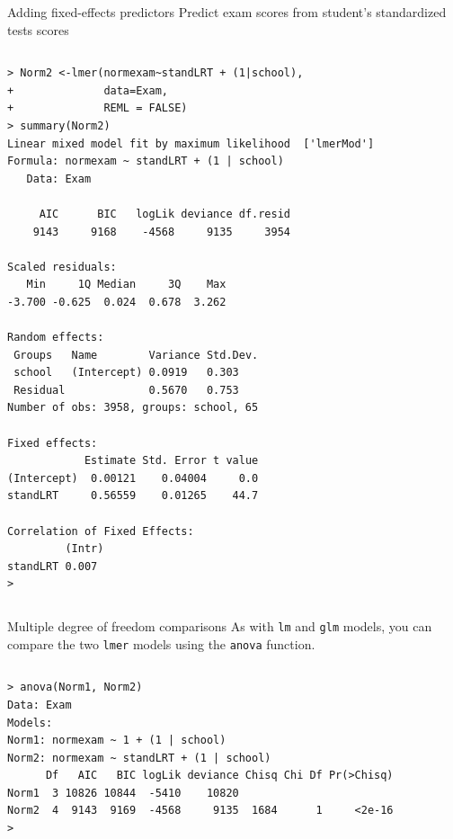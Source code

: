 \documentclass[table,smaller]{beamer}
\begin{document}
\begin{frame}[fragile,label=sec-5-4]{Adding fixed-effects predictors}
 Predict exam scores from student's standardized tests scores

\vspace{-.5em}
\begin{columns}
\begin{block}{}
\begin{verbatim}
> Norm2 <-lmer(normexam~standLRT + (1|school),
+              data=Exam,
+              REML = FALSE) 
> summary(Norm2) 
Linear mixed model fit by maximum likelihood  ['lmerMod']
Formula: normexam ~ standLRT + (1 | school)
   Data: Exam

     AIC      BIC   logLik deviance df.resid 
    9143     9168    -4568     9135     3954 

Scaled residuals: 
   Min     1Q Median     3Q    Max 
-3.700 -0.625  0.024  0.678  3.262 

Random effects:
 Groups   Name        Variance Std.Dev.
 school   (Intercept) 0.0919   0.303   
 Residual             0.5670   0.753   
Number of obs: 3958, groups: school, 65

Fixed effects:
            Estimate Std. Error t value
(Intercept)  0.00121    0.04004     0.0
standLRT     0.56559    0.01265    44.7

Correlation of Fixed Effects:
         (Intr)
standLRT 0.007 
>
\end{verbatim}
\end{block}
\end{columns}
\vspace{.5em}
\end{frame}


\begin{frame}[fragile,label=sec-5-5]{Multiple degree of freedom comparisons}
 As with \texttt{lm} and \texttt{glm} models, you can compare the two \texttt{lmer} models using the \texttt{anova} function.

\vspace{-.5em}
\begin{columns}
\begin{block}{}
\begin{verbatim}
> anova(Norm1, Norm2)
Data: Exam
Models:
Norm1: normexam ~ 1 + (1 | school)
Norm2: normexam ~ standLRT + (1 | school)
      Df   AIC   BIC logLik deviance Chisq Chi Df Pr(>Chisq)
Norm1  3 10826 10844  -5410    10820                        
Norm2  4  9143  9169  -4568     9135  1684      1     <2e-16
>
\end{verbatim}
\end{block}
\end{columns}
\vspace{.5em}
\end{frame}
\end{document}
